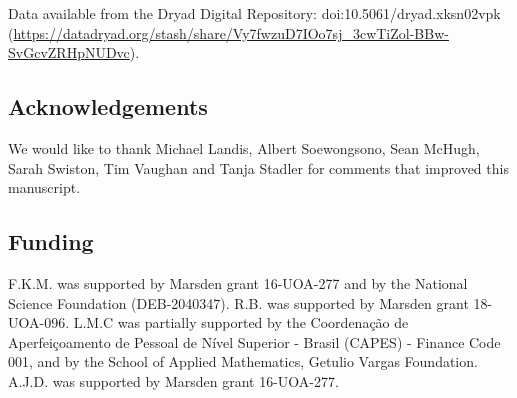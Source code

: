\documentclass[oneside]{article}
\begin{document}
Data available from the Dryad Digital Repository: doi:10.5061/dryad.xksn02vpk (\url{https://datadryad.org/stash/share/Vy7fwzuD7IOo7sj_3cwTiZol-BBw-SvGcvZRHpNUDvc}).

\subsection*{Acknowledgements}

We would like to thank Michael Landis, Albert Soewongsono, Sean McHugh, Sarah Swiston, Tim Vaughan and Tanja Stadler for comments that improved this manuscript.

\subsection*{Funding}
F.K.M. was supported by Marsden grant 16-UOA-277 and by the National Science Foundation (DEB-2040347).
R.B. was supported by Marsden grant 18-UOA-096.
L.M.C was partially supported by the Coordenação de Aperfeiçoamento de
Pessoal de Nível Superior - Brasil (CAPES) - Finance Code 001, and by the School of Applied Mathematics,  Getulio Vargas Foundation.
A.J.D. was supported by Marsden grant 16-UOA-277.






\end{document}
